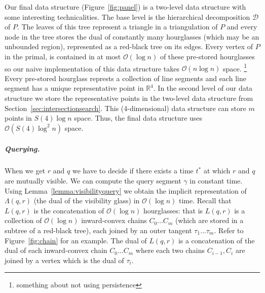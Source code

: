 \documentclass[UKenglish]{lipics-v2019}
\begin{document}
Our final data structure (Figure~\ref{fig:panel}) is a two-level data structure with some interesting technicalities. The base level is the hierarchical decomposition $\mathcal{D}$ of $P$. The leaves of this tree represent a triangle in a triangulation of $P$ and every node in the tree stores the dual of constantly many hourglasses (which may be an unbounded region), represented as a red-black tree on its edges. Every vertex of $P$ in the primal, is contained in at most $\mathcal{O}(\log n)$ of these pre-stored hourglasses \cite{FRANK} so our naive implementation of this data structure takes $\mathcal{O}(n \log n)$ space. \footnote{something about not using persistence}
Every pre-stored hourglass represts a collection of line segments and each line segment has a unique representative point in $\mathbb{R}^4$. In the second level of our data structure we store the representative points in the two-level data structure from Section~\ref{sec:intersectionsearch}. This (4-dimensional) data structure can store $m$ points in $S(4) \log n$ space. Thus, the final data structure uses $\mathcal{O}(S(4) \log^2 n)$ space.

\subparagraph{Querying.}
When we get $r$ and $q$ we have to decide if there exists
a time $t^*$ at which $r$ and $q$ are mutually visible. We can compute the query segment $\gamma$ in constant time. Using Lemma~\ref{lemma:visibilityquery} we obtain the implicit representation of $\Lambda(q,r)$ (the dual of the visibility glass) in $\mathcal{O}(\log n)$ time. Recall that $L(q,r)$ is the concatenation of $\mathcal{O}(\log n)$ hourglasses: that is $L(q,r)$ is a collection of $\mathcal{O}(\log n)$ inward-convex chains $C_0 \ldots C_m$ (which are stored in a subtree of a red-black tree), each joined by an outer tangent $\tau_1 \ldots \tau_{m}$. Refer to Figure~\ref{fig:chain} for an example. The dual of $L(q,r)$ is a concatenation of the dual of each inward-convex chain $C_0 \ldots C_m$ where each two chains $C_{i-1}, C_{i}$ are joined by a vertex which is the dual of $\tau_i$. 
\end{document}
